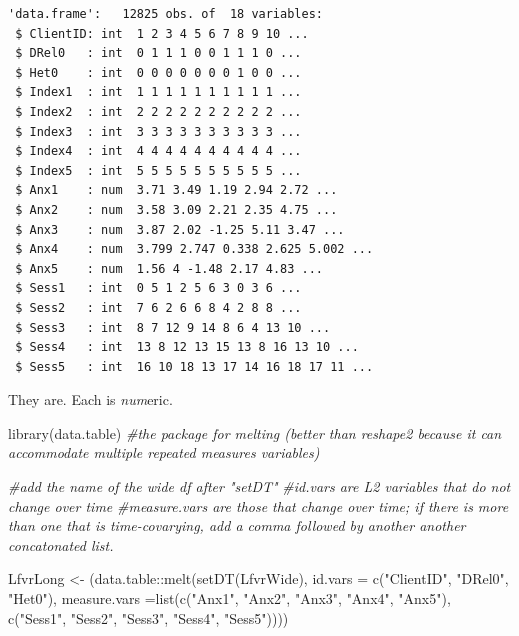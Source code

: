 \documentclass[
  english,
]{book}
\newenvironment{Shaded}{\begin{snugshade}}{\end{snugshade}}
\newcommand{\AttributeTok}[1]{\textcolor[rgb]{0.77,0.63,0.00}{#1}}
\newcommand{\CommentTok}[1]{\textcolor[rgb]{0.56,0.35,0.01}{\textit{#1}}}
\newcommand{\FunctionTok}[1]{\textcolor[rgb]{0.00,0.00,0.00}{#1}}
\newcommand{\NormalTok}[1]{#1}
\newcommand{\OtherTok}[1]{\textcolor[rgb]{0.56,0.35,0.01}{#1}}
\newcommand{\SpecialCharTok}[1]{\textcolor[rgb]{0.00,0.00,0.00}{#1}}
\newcommand{\StringTok}[1]{\textcolor[rgb]{0.31,0.60,0.02}{#1}}
\begin{document}
\begin{verbatim}
'data.frame':   12825 obs. of  18 variables:
 $ ClientID: int  1 2 3 4 5 6 7 8 9 10 ...
 $ DRel0   : int  0 1 1 1 0 0 1 1 1 0 ...
 $ Het0    : int  0 0 0 0 0 0 0 1 0 0 ...
 $ Index1  : int  1 1 1 1 1 1 1 1 1 1 ...
 $ Index2  : int  2 2 2 2 2 2 2 2 2 2 ...
 $ Index3  : int  3 3 3 3 3 3 3 3 3 3 ...
 $ Index4  : int  4 4 4 4 4 4 4 4 4 4 ...
 $ Index5  : int  5 5 5 5 5 5 5 5 5 5 ...
 $ Anx1    : num  3.71 3.49 1.19 2.94 2.72 ...
 $ Anx2    : num  3.58 3.09 2.21 2.35 4.75 ...
 $ Anx3    : num  3.87 2.02 -1.25 5.11 3.47 ...
 $ Anx4    : num  3.799 2.747 0.338 2.625 5.002 ...
 $ Anx5    : num  1.56 4 -1.48 2.17 4.83 ...
 $ Sess1   : int  0 5 1 2 5 6 3 0 3 6 ...
 $ Sess2   : int  7 6 2 6 6 8 4 2 8 8 ...
 $ Sess3   : int  8 7 12 9 14 8 6 4 13 10 ...
 $ Sess4   : int  13 8 12 13 15 13 8 16 13 10 ...
 $ Sess5   : int  16 10 18 13 17 14 16 18 17 11 ...
\end{verbatim}

They are. Each is \emph{num}eric.

\begin{Shaded}
\begin{Highlighting}[]
\FunctionTok{library}\NormalTok{(data.table) }\CommentTok{\#the package for melting (better than reshape2 because it can accommodate multiple repeated measures variables)}

\CommentTok{\#add the name of the wide df after "setDT"}
\CommentTok{\#id.vars are L2 variables that do not change over time}
\CommentTok{\#measure.vars are those that change over time; if there is more than one that is time{-}covarying, add a comma followed by another another concatonated list.}

\NormalTok{LfvrLong }\OtherTok{\textless{}{-}}\NormalTok{ (data.table}\SpecialCharTok{::}\FunctionTok{melt}\NormalTok{(}\FunctionTok{setDT}\NormalTok{(LfvrWide), }\AttributeTok{id.vars =} \FunctionTok{c}\NormalTok{(}\StringTok{"ClientID"}\NormalTok{, }\StringTok{"DRel0"}\NormalTok{, }\StringTok{"Het0"}\NormalTok{), }\AttributeTok{measure.vars =}\FunctionTok{list}\NormalTok{(}\FunctionTok{c}\NormalTok{(}\StringTok{"Anx1"}\NormalTok{, }\StringTok{"Anx2"}\NormalTok{, }\StringTok{"Anx3"}\NormalTok{, }\StringTok{"Anx4"}\NormalTok{, }\StringTok{"Anx5"}\NormalTok{), }\FunctionTok{c}\NormalTok{(}\StringTok{"Sess1"}\NormalTok{, }\StringTok{"Sess2"}\NormalTok{, }\StringTok{"Sess3"}\NormalTok{, }\StringTok{"Sess4"}\NormalTok{, }\StringTok{"Sess5"}\NormalTok{))))}
\end{Highlighting}
\end{Shaded}
\end{document}
